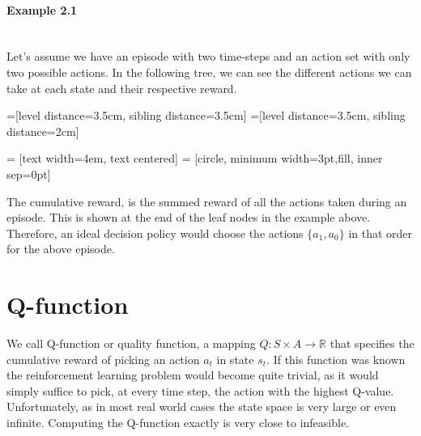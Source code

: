 \paragraph{Example 2.1}\mbox{}\\
Let's assume we have an episode with two time-steps and an action set with only two possible actions. In the following tree, we can see the different actions we can take at each state and their respective reward.

=[level distance=3.5cm, sibling distance=3.5cm]
=[level distance=3.5cm, sibling distance=2cm]

 = [text width=4em, text centered]
 = [circle, minimum width=3pt,fill, inner sep=0pt]

\begin{center}
	
\end{center}
The cumulative reward, is the summed reward of all the actions taken during an episode. This is shown at the end of the leaf nodes in the example above. Therefore, an ideal decision policy would choose the actions $\{a_1,a_0\}$ in that order for the above episode.
 \section{Q-function}
 We call Q-function or quality function, a mapping $Q:S \times A \rightarrow \mathbb{R}$ that specifies the cumulative reward of picking an action $a_t$ in state $s_t$. If this function was known the reinforcement learning problem would become quite trivial, as it would simply suffice to pick, at every time step, the action with the highest Q-value.\\
 Unfortunately, as in most real world cases the state space is very large or even infinite. Computing the Q-function exactly is very close to infeasible.

